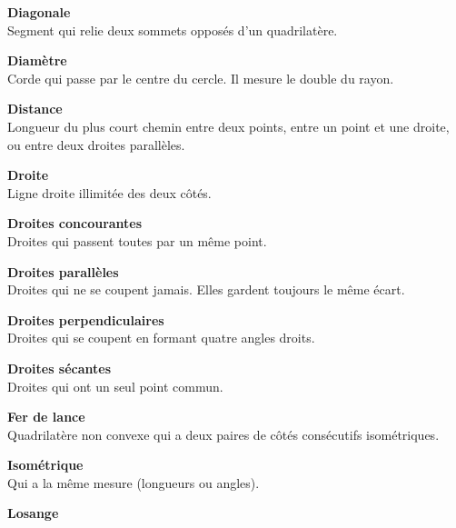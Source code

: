 \begin{tcbraster}[raster columns=2, raster equal height, raster valign=top,raster column skip=2mm, raster row skip=2mm]
\begin{terme}
\textbf{\large Diagonale}\\[2pt]
{\small Segment qui relie deux sommets opposés d'un quadrilatère.}
\end{terme}
\begin{terme}
\textbf{\large Diamètre}\\[2pt]
{\small Corde qui passe par le centre du cercle. Il mesure le double du rayon.}
\end{terme}
\begin{terme}
\textbf{\large Distance}\\[2pt]
{\small Longueur du plus court chemin entre deux points, entre un point et une droite, ou entre deux droites parallèles.}
\end{terme}
\begin{terme}
\textbf{\large Droite}\\[2pt]
{\small Ligne droite illimitée des deux côtés.}
\end{terme}
\begin{terme}
\textbf{\large Droites concourantes}\\[2pt]
{\small Droites qui passent toutes par un même point.}
\end{terme}
\begin{terme}
\textbf{\large Droites parallèles}\\[2pt]
{\small Droites qui ne se coupent jamais. Elles gardent toujours le même écart.}
\end{terme}
\begin{terme}
\textbf{\large Droites perpendiculaires}\\[2pt]
{\small Droites qui se coupent en formant quatre angles droits.}
\end{terme}
\begin{terme}
\textbf{\large Droites sécantes}\\[2pt]
{\small Droites qui ont un seul point commun.}
\end{terme}
\begin{terme}
\textbf{\large Fer de lance}\\[2pt]
{\small Quadrilatère non convexe qui a deux paires de côtés consécutifs isométriques.}
\end{terme}
\begin{terme}
\textbf{\large Isométrique}\\[2pt]
{\small Qui a la même mesure (longueurs ou angles).}
\end{terme}
\begin{terme}
\textbf{\large Losange}\\[2pt]

\end{terme}
\end{tcbraster}
